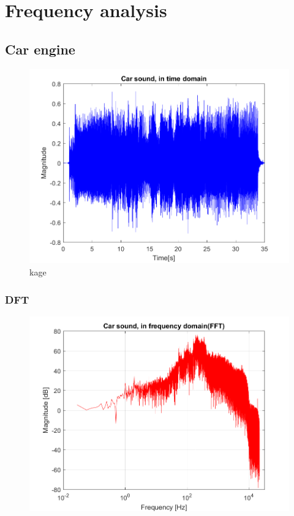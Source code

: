 \section{Frequency analysis}
\label{sec:analysis}
\subsection{Car engine}

\begin{figure}
	\includegraphics[width=\textwidth]{code/Car_figure1.png}
	\caption{kage}
	\label{fig:Car_figure1:1}
\end{figure}

\subsubsection{DFT}
\begin{figure}
	\centering
	\includegraphics[width=\textwidth]{code/Car_figure2.png}
	\caption{}
	\label{fig:Car_figure2:2}
\end{figure}




